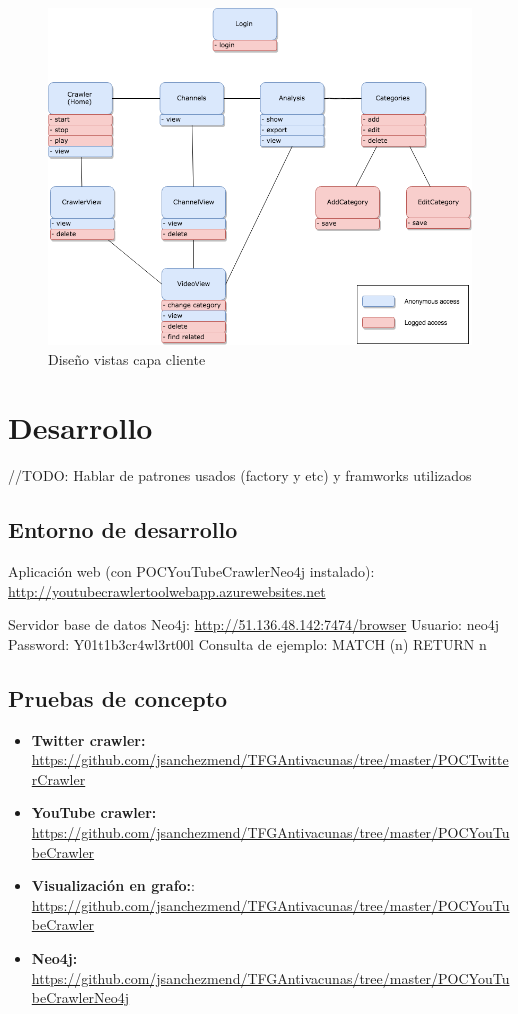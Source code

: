 \documentclass[11pt,a4paper]{article}
\begin{document}
\begin{figure}[H]
\centering
\includegraphics[scale=0.25]{diseno/capaCliente.png}
\caption{Diseño vistas capa cliente}
\end{figure}

\newpage 




\section{Desarrollo}
\bigskip

//TODO: Hablar de patrones usados (factory y etc) y framworks utilizados
\subsection{Entorno de desarrollo}
Aplicación web (con POCYouTubeCrawlerNeo4j instalado):
\url{http://youtubecrawlertoolwebapp.azurewebsites.net} 

Servidor base de datos Neo4j:
\url{http://51.136.48.142:7474/browser} 
Usuario: neo4j
Password: Y01t1b3cr4wl3rt00l
Consulta de ejemplo: MATCH (n) RETURN n
\medskip 

\subsection{Pruebas de concepto}
\begin{itemize}
\item \textbf{Twitter crawler:} \url{https://github.com/jsanchezmend/TFGAntivacunas/tree/master/POCTwitterCrawler}
\item \textbf{YouTube crawler:} \url{https://github.com/jsanchezmend/TFGAntivacunas/tree/master/POCYouTubeCrawler}
\item \textbf{Visualización en grafo:}: \url{https://github.com/jsanchezmend/TFGAntivacunas/tree/master/POCYouTubeCrawler}
\item \textbf{Neo4j:} \url{https://github.com/jsanchezmend/TFGAntivacunas/tree/master/POCYouTubeCrawlerNeo4j}
\end{itemize}
\medskip 
\end{document}

